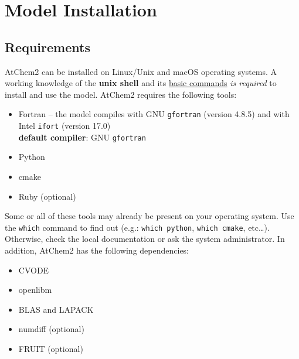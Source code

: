 %
%
%
%

\chapter{Model Installation} \label{ch:installation}

\section{Requirements} \label{sec:requirements}

AtChem2 can be installed on Linux/Unix and macOS operating systems. A
working knowledge of the \textbf{unix shell} and its
\href{https://swcarpentry.github.io/shell-novice/reference/}{basic commands}
\emph{is required} to install and use the model. AtChem2 requires the
following tools:

\begin{itemize}
\item Fortran -- the model compiles with GNU \texttt{gfortran} (version
  4.8.5) and with Intel \texttt{ifort} (version 17.0)\\
  \textbf{default compiler}: GNU \texttt{gfortran}
\item Python
\item cmake
\item Ruby (optional)
\end{itemize}

Some or all of these tools may already be present on your operating
system. Use the \texttt{which} command to find out (e.g.:
\verb|which python|, \verb|which cmake|, etc\ldots). Otherwise, check
the local documentation or ask the system administrator. In addition,
AtChem2 has the following dependencies:

\begin{itemize}
\item CVODE
\item openlibm
\item BLAS and LAPACK
\item numdiff (optional)
\item FRUIT (optional)
\end{itemize}


